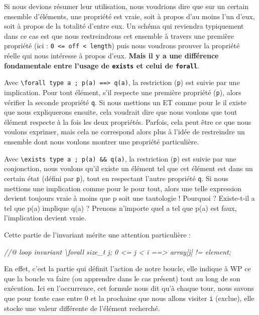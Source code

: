\documentclass[12pt,francais,]{scrbook}
\newenvironment{Shaded}{}{}
\newcommand{\CommentTok}[1]{\textcolor[rgb]{0.38,0.63,0.69}{\textit{{#1}}}}
\begin{document}
Si nous devions résumer leur utilisation, nous voudrions dire que sur un
certain ensemble d'éléments, une propriété est vraie, soit à propos d'au
moins l'un d'eux, soit à propos de la totalité d'entre eux. Un schéma
qui reviendra typiquement dans ce cas est que nous restreindrons cet
ensemble à travers une première propriété (ici :
\texttt{0\ \textless{}=\ off\ \textless{}\ length}) puis nous voudrons
prouver la propriété réelle qui nous intéresse à propos d'eux.
\textbf{Mais il y a une différence fondamentale entre l'usage de
\texttt{exists} et celui de \texttt{forall}}.

Avec
\texttt{\textbackslash{}forall\ type\ a\ ;\ p(a)\ ==\textgreater{}\ q(a)},
la restriction (\texttt{p}) est suivie par une implication. Pour tout
élément, s'il respecte une première propriété (\texttt{p}), alors
vérifier la seconde propriété \texttt{q}. Si nous mettions un ET comme
pour le \og{}il existe\fg{} que nous expliquerons ensuite, cela voudrait dire
que nous voulons que tout élément respecte à la fois les deux
propriétés. Parfois, cela peut être ce que nous voulons exprimer, mais
cela ne correspond alors plus à l'idée de restreindre un ensemble dont
nous voulons montrer une propriété particulière.

Avec \texttt{\textbackslash{}exists\ type\ a\ ;\ p(a)\ \&\&\ q(a)}, la
restriction (\texttt{p}) est suivie par une conjonction, nous voulons
qu'il existe un élément tel que cet élément est dans un certain état
(défini par \texttt{p}), tout en respectant l'autre propriété
\texttt{q}. Si nous mettions une implication comme pour le \og{}pour
tout\fg{}, alors une telle expression devient toujours vraie à moins que p
soit une tautologie ! Pourquoi ? Existe-t-il \og{}a\fg{} tel que p(a) implique
q(a) ? Prenons n'importe quel \og{}a\fg{} tel que p(a) est faux, l'implication
devient vraie.

Cette partie de l'invariant mérite une attention particulière :

\begin{footnotesize}\begin{Shaded}
\begin{Highlighting}[]
\CommentTok{//@ loop invariant \textbackslash{}forall size_t j; 0 <= j < i ==> array[j] != element;}
\end{Highlighting}
\end{Shaded}\end{footnotesize}

En effet, c'est la partie qui définit l'action de notre boucle, elle
indique à WP ce que la boucle va faire (ou apprendre dans le cas
présent) tout au long de son exécution. Ici en l'occurrence, cet formule
nous dit qu'à chaque tour, nous savons que pour toute case entre 0 et la
prochaine que nous allons visiter \texttt{i} (exclue), elle stocke une
valeur différente de l'élément recherché.
\end{document}
